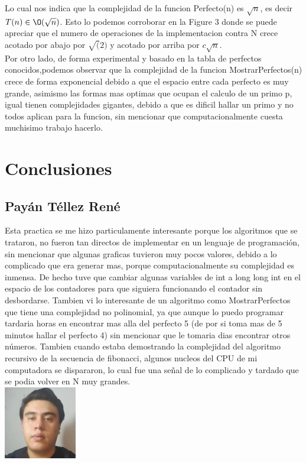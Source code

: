 \documentclass[spanish]{article}
\begin{document}
	Lo cual nos indica que la complejidad de la funcion Perfecto(n) es $\sqrt{n}$, es decir $T(n)\in\O(\sqrt{n})$. Esto lo podemos corroborar en la Figure 3 donde se puede apreciar que el numero de operaciones de la implementacion contra N crece acotado por abajo por $\sqrt(2)$ y acotado por arriba por $c\sqrt{n}$.\\			
	Por otro lado, de forma experimental y basado en la tabla de perfectos conocidos,podemos observar que la complejidad de la funcion MostrarPerfectos(n) crece de forma exponencial debido a que el espacio entre cada perfecto es muy grande, asimismo las formas mas optimas que ocupan el calculo de un primo p, igual tienen complejidades gigantes, debido a que es dificil hallar un primo y no todos aplican para la funcion, sin mencionar que computacionalmente cuesta muchisimo trabajo hacerlo.
	
	\section{Conclusiones}			
	\subsection{Payán Téllez René}
	Esta practica se me hizo particulamente interesante porque los algoritmos que se trataron, no fueron tan directos de implementar en un lenguaje de programación, sin mencionar que algunas graficas tuvieron muy pocos valores, debido a lo complicado que era generar mas, porque computacionalmente su complejidad es inmensa. De hecho tuve que cambiar algunas variables de int a long long int en el espacio de los contadores para que siguiera funcionando el contador sin desbordarse. Tambien vi lo interesante de un algoritmo como MostrarPerfectos que tiene una complejidad no polinomial, ya que aunque lo puedo programar tardaria horas en encontrar mas alla del perfecto 5 (de por si toma mas de 5 minutos hallar el perfecto 4) sin mencionar que le tomaria dias encontrar otros números. Tambien cuando estaba demostrando la complejidad del algoritmo recursivo de la secuencia de fibonacci, algunos nucleos del CPU de mi computadora se dispararon, lo cual fue una señal de lo complicado y tardado que se podia volver en N muy grandes.\\
	\includegraphics[height=120px,width=120px]{Rene}
\end{document}
